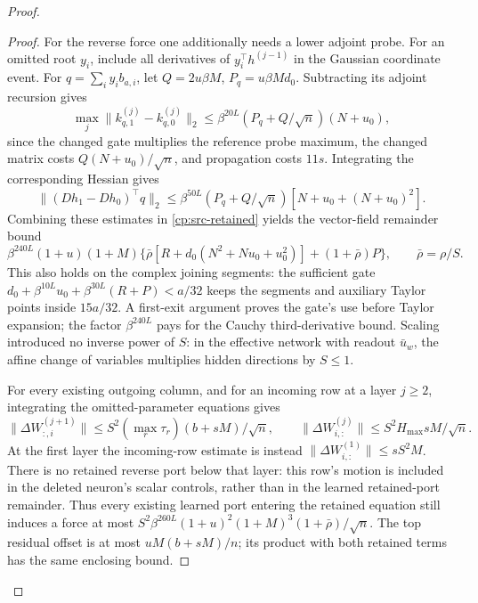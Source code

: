 \begin{proof}
\begin{proof}
For the reverse force one additionally needs a lower adjoint probe.
For an omitted root \(y_i\), include all derivatives of
\(y_i^\top h^{(j-1)}\) in the Gaussian coordinate event.
For \(q=\sum_iy_ib_{a,i}\), let \(Q=2u\beta M\),
\(P_q=u\beta Md_0\).  Subtracting its adjoint recursion gives
\[
 \max_j\|k_{q,1}^{(j)}-k_{q,0}^{(j)}\|_2
 \le\beta^{20L}(P_q+Q/\sqrt n)(N+u_0),
\]
since the changed gate multiplies the reference probe maximum, the
changed matrix costs \(Q(N+u_0)/\sqrt n\), and propagation costs
\(11s\).  Integrating the corresponding Hessian gives
\[
 \|(Dh_1-Dh_0)^\top q\|_2
 \le\beta^{50L}(P_q+Q/\sqrt n)[N+u_0+(N+u_0)^2].
\]
Combining these estimates in \eqref{cp:src-retained} yields the
vector-field remainder bound
\begin{equation}
 \beta^{240L}(1+u)(1+M)
 \{\bar\rho[R+d_0(N^2+Nu_0+u_0^2)]+(1+\bar\rho)P\},
 \qquad \bar\rho=\rho/S. \label{cp:src-force-remainder}
\end{equation}
This also holds on the complex joining segments: the sufficient gate
\(d_0+\beta^{10L}u_0+\beta^{30L}(R+P)<a/32\)
keeps the segments and auxiliary Taylor points inside \(15a/32\).
A first-exit argument proves the gate's use before Taylor expansion;
the factor \(\beta^{240L}\) pays for the Cauchy third-derivative
bound.  Scaling introduced no inverse power of \(S\): in the
effective network with readout \(\bar u_w\), the affine change of
variables multiplies hidden directions by \(S\le1\).

For every existing outgoing column, and for an incoming row at a
layer \(j\ge2\), integrating the omitted-parameter equations gives
\[
 \|\Delta W^{(j+1)}_{:,i}\|
       \le S^2(\max_r\tau_r)(b+sM)/\sqrt n,
 \qquad
 \|\Delta W^{(j)}_{i,:}\|
       \le S^2H_{\max}sM/\sqrt n.
\]
At the first layer the incoming-row estimate is instead
\(\|\Delta W^{(1)}_{i,:}\|\le sS^2M\).
There is no retained reverse port below that layer: this row's
motion is included in the deleted neuron's scalar controls, rather
than in the learned retained-port remainder. Thus every existing
learned port entering the retained equation still induces a force
at most
\(S^2\beta^{260L}(1+u)^2(1+M)^3(1+\bar\rho)/\sqrt n\).
The top residual offset is at most \(uM(b+sM)/n\); its product
with both retained terms has the same enclosing bound.


\end{proof}
\end{proof}
